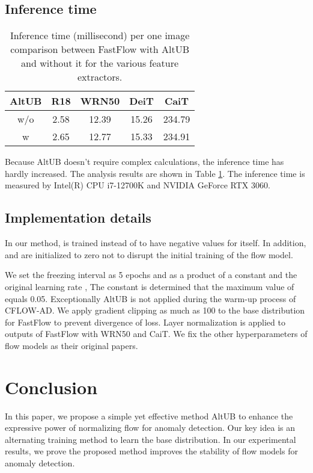 \documentclass[letterpaper]{article}
\begin{document}
\subsection{Inference time} 
\begin{table}[t]
\caption{Inference time (millisecond) per one image comparison between FastFlow with AltUB and without it for the various feature extractors.}
\label{table-fastflow-time}
\centering
\begin{tabular}{c|c|c|c|c}
\hline
AltUB & R18                 & WRN50           & DeiT                   & CaiT                   \\
\hline
w/o    & 2.58 & 12.39 & 15.26 & 234.79          \\
w      & 2.65 & 12.77 & 15.33 & 234.91 \\
\hline
\end{tabular}
\end{table}

Because AltUB doesn't require complex calculations, the inference time has hardly increased. The analysis results are shown in Table \ref{table-fastflow-time}. The inference time is measured by Intel(R) CPU i7-12700K and NVIDIA GeForce RTX 3060.

\subsection{Implementation details}
In our method,  is trained instead of  to have negative values for itself. In addition,  and  are initialized to zero not to disrupt the initial training of the flow model.

We set the freezing interval as 5 epochs and  as a product of a constant and the original learning rate , The constant is determined that the maximum value of  equals 0.05. Exceptionally AltUB is not applied during the warm-up process of CFLOW-AD. We apply gradient clipping as much as 100 to the base distribution for FastFlow to prevent divergence of loss. Layer normalization is applied to outputs of FastFlow with WRN50 and CaiT. We fix the other hyperparameters of flow models as their original papers.

\section{Conclusion}
In this paper, we propose a simple yet effective method AltUB to enhance the expressive power of normalizing flow for anomaly detection. Our key idea is an alternating training method to learn the base distribution. In our experimental results, we prove the proposed method improves the stability of flow models for anomaly detection.
\end{document}
